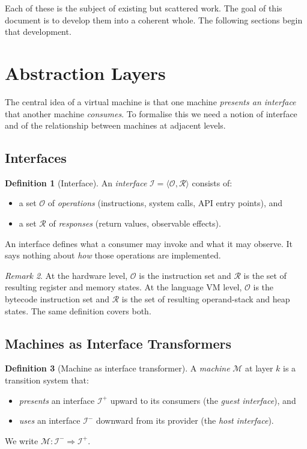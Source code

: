 \documentclass[11pt, a4paper]{article}
\theoremstyle{definition}
\newtheorem{definition}{Definition}[section]
\theoremstyle{plain}
\theoremstyle{remark}
\newtheorem{remark}[definition]{Remark}
\begin{document}
Each of these is the subject of existing but scattered work. The goal of this
document is to develop them into a coherent whole. The following sections
begin that development.


\section{Abstraction Layers}
\label{sec:layers}

The central idea of a virtual machine is that one machine \emph{presents an
interface} that another machine \emph{consumes}. To formalise this we need a
notion of interface and of the relationship between machines at adjacent
levels.

\subsection{Interfaces}

\begin{definition}[Interface]
  An \emph{interface} $\mathcal{I} = \langle\mathcal{O}, \mathcal{R}\rangle$ consists of:
  \begin{itemize}
    \item a set $\mathcal{O}$ of \emph{operations} (instructions, system
          calls, API entry points), and
    \item a set $\mathcal{R}$ of \emph{responses} (return values, observable
          effects).
  \end{itemize}
  An interface defines what a consumer may invoke and what it may observe.
  It says nothing about \emph{how} those operations are implemented.
\end{definition}

\begin{remark}
  At the hardware level, $\mathcal{O}$ is the instruction set and
  $\mathcal{R}$ is the set of resulting register and memory states.
  At the language VM level, $\mathcal{O}$ is the bytecode instruction set and
  $\mathcal{R}$ is the set of resulting operand-stack and heap states.
  The same definition covers both.
\end{remark}

\subsection{Machines as Interface Transformers}

\begin{definition}[Machine as interface transformer]
  A \emph{machine} $\mathcal{M}$ at layer $k$ is a transition system that:
  \begin{itemize}
    \item \emph{presents} an interface $\mathcal{I}^{+}$ upward to its
          consumers (the \emph{guest interface}), and
    \item \emph{uses} an interface $\mathcal{I}^{-}$ downward from its
          provider (the \emph{host interface}).
  \end{itemize}
  We write $\mathcal{M} : \mathcal{I}^{-} \Rightarrow \mathcal{I}^{+}$.
\end{definition}
\end{document}
